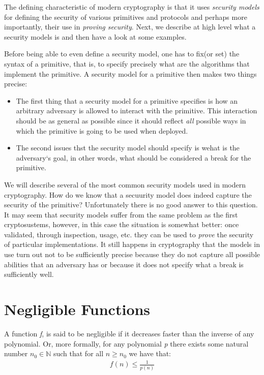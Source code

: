 \documentclass[oneside,a4paper,12pt]{book}
\begin{document}
The defining characteristic of modern cryptography is that it uses \textit{security models} for defining the security of various primitives and protocols and perhaps more importantly, their use in \textit{proving security}. Next, we describe at high level what a security models is and then have a look at some examples.

Before being able to even define a security model, one has to fix(or set) the syntax of a primitive, that is, to specify precisely what are the algorithms that implement the primitive. A security model for a primitive then makes two things precise:

\begin{itemize}
\item The first thing that a security model for a primitive specifies is how an arbitrary adversary is allowed to interact with the primitive. This interaction should be as general as possible since it should reflect \textit{all} possible ways in which the primitive is going to be used when deployed.
\item The second issues thst the security model should specify is wehat is the adversary`s goal, in other words, what should be considered a break for the primitive.
\end{itemize}

We will describe several of the most common security models used in modern cryptography. How do we know that a secuurity model does indeed capture the security of the primitive? Unfortunately there is no good answer to this question. It may seem that security models suffer from the same problem as the first cryptosustems, however, in this case the situation is somewhat better: once validated, through inspection, usage, etc. they can be used to \textit{prove} the security of particular implementations. It still happens in cryptography that the models in use turn out not to be sufficiently precise because they do not capture all possible abilities that an adversary has or because it does not specify what a break is sufficiently well.

\section{Negligible Functions}

A function \textit{f}, is said to be negligible if it decreases faster than the inverse of any polynomial. Or, more formally, for any polynomial \textit{p} there exists some natural number \begin{math}n_0 \in \mathbb{N} \end{math} such that for all \begin{math} n\geq n_0\end{math} we have that:
\begin{align*}f(n) \leq \frac{1}{p(n)} \end{align*}
\end{document}
